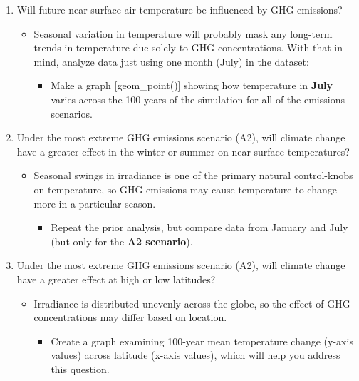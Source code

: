 \documentclass[]{book}
\providecommand{\tightlist}{%
  \setlength{\itemsep}{0pt}\setlength{\parskip}{0pt}}
\begin{document}
\begin{enumerate}
\def\labelenumi{\arabic{enumi}.}
\tightlist
\item
  Will future near-surface air temperature be influenced by GHG emissions?

  \begin{itemize}
  \tightlist
  \item
    Seasonal variation in temperature will probably mask any long-term trends in temperature due solely to GHG concentrations. With that in mind, analyze data just using one month (July) in the dataset:

    \begin{itemize}
    \tightlist
    \item
      Make a graph {[}geom\_point(){]} showing how temperature in \textbf{July} varies across the 100 years of the simulation for all of the emissions scenarios.
    \end{itemize}
  \end{itemize}
\item
  Under the most extreme GHG emissions scenario (A2), will climate change have a greater effect in the winter or summer on near-surface temperatures?

  \begin{itemize}
  \tightlist
  \item
    Seasonal swings in irradiance is one of the primary natural control-knobs on temperature, so GHG emissions may cause temperature to change more in a particular season.

    \begin{itemize}
    \tightlist
    \item
      Repeat the prior analysis, but compare data from January and July (but only for the \textbf{A2 scenario}).
    \end{itemize}
  \end{itemize}
\item
  Under the most extreme GHG emissions scenario (A2), will climate change have a greater effect at high or low latitudes?

  \begin{itemize}
  \tightlist
  \item
    Irradiance is distributed unevenly across the globe, so the effect of GHG concentrations may differ based on location.

    \begin{itemize}
    \tightlist
    \item
      Create a graph examining 100-year mean temperature change (y-axis values) across latitude (x-axis values), which will help you address this question.
    \end{itemize}
  \end{itemize}
\end{enumerate}
\end{document}
